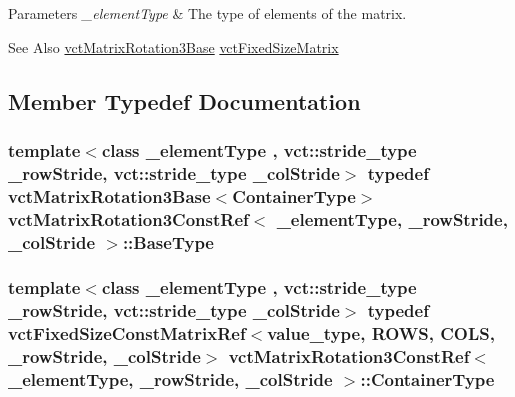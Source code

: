 \begin{DoxyParams}{Parameters}
{\em \-\_\-element\-Type} & The type of elements of the matrix.\\
\hline
\end{DoxyParams}
\begin{DoxySeeAlso}{See Also}
\hyperlink{classvct_matrix_rotation3_base}{vct\-Matrix\-Rotation3\-Base} \hyperlink{classvct_fixed_size_matrix}{vct\-Fixed\-Size\-Matrix} 
\end{DoxySeeAlso}


\subsection{Member Typedef Documentation}
\hypertarget{classvct_matrix_rotation3_const_ref_a72312c3cf0fe6a145043764cdd412bad}{
\subsubsection[{Base\-Type}]{\setlength{\rightskip}{0pt plus 5cm}template$<$class \-\_\-element\-Type , vct\-::stride\-\_\-type \-\_\-row\-Stride, vct\-::stride\-\_\-type \-\_\-col\-Stride$>$ typedef {\bf vct\-Matrix\-Rotation3\-Base}$<${\bf Container\-Type}$>$ {\bf vct\-Matrix\-Rotation3\-Const\-Ref}$<$ \-\_\-element\-Type, \-\_\-row\-Stride, \-\_\-col\-Stride $>$\-::{\bf Base\-Type}}}\label{classvct_matrix_rotation3_const_ref_a72312c3cf0fe6a145043764cdd412bad}
\hypertarget{classvct_matrix_rotation3_const_ref_ae183b3a17186cc240b1cba80e74d0724}{
\subsubsection[{Container\-Type}]{\setlength{\rightskip}{0pt plus 5cm}template$<$class \-\_\-element\-Type , vct\-::stride\-\_\-type \-\_\-row\-Stride, vct\-::stride\-\_\-type \-\_\-col\-Stride$>$ typedef {\bf vct\-Fixed\-Size\-Const\-Matrix\-Ref}$<$value\-\_\-type, {\bf R\-O\-W\-S}, {\bf C\-O\-L\-S}, \-\_\-row\-Stride, \-\_\-col\-Stride$>$ {\bf vct\-Matrix\-Rotation3\-Const\-Ref}$<$ \-\_\-element\-Type, \-\_\-row\-Stride, \-\_\-col\-Stride $>$\-::{\bf Container\-Type}}}\label{classvct_matrix_rotation3_const_ref_ae183b3a17186cc240b1cba80e74d0724}
